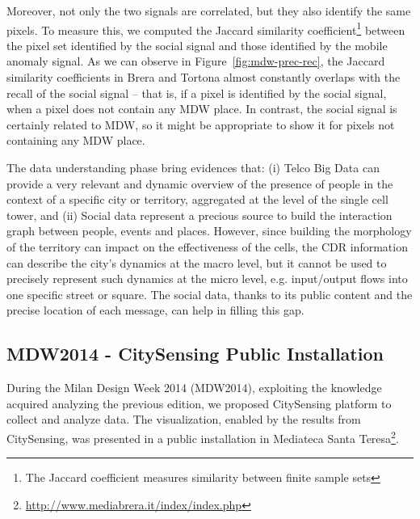 Moreover, not only the two signals are correlated, but they also identify the same pixels. To measure this, we computed the Jaccard similarity coefficient\footnote{The Jaccard coefficient measures similarity between finite sample sets} between the pixel set identified by the social signal and those identified by the mobile anomaly signal. 
As we can observe in Figure~\ref{fig:mdw-prec-rec}, the Jaccard similarity coefficients in Brera and Tortona almost constantly overlaps with the recall of the social signal -- that is, if a pixel is identified by the social signal, when a pixel does not contain any MDW place. In contrast, the social signal is certainly related to MDW, so it might be appropriate to show it for pixels not containing any MDW place.


The data understanding phase bring evidences that: (i) Telco Big Data can provide a very relevant and dynamic overview of the presence of people in the context of a specific city or territory, aggregated at the level of the single cell tower, and (ii) Social data represent a precious source to build the interaction graph between people, events and places. 
However, since building the morphology of the territory can impact on the effectiveness of the cells, the CDR information can describe the city's dynamics at the macro level, but it cannot be used to precisely represent such dynamics at the micro level, e.g. input/output flows into one specific street or square. The social data, thanks to its public content and the precise location of each message, can help in filling this gap.

\subsection{MDW2014 - CitySensing Public Installation} \label{sec:cs-mdw-2014}
During the Milan Design Week 2014 (MDW2014), exploiting the knowledge acquired analyzing the previous edition, we proposed CitySensing platform to collect and analyze data. The visualization, enabled by the results from CitySensing, was presented in a public installation in Mediateca Santa Teresa\footnote{\url{http://www.mediabrera.it/index/index.php}}.

